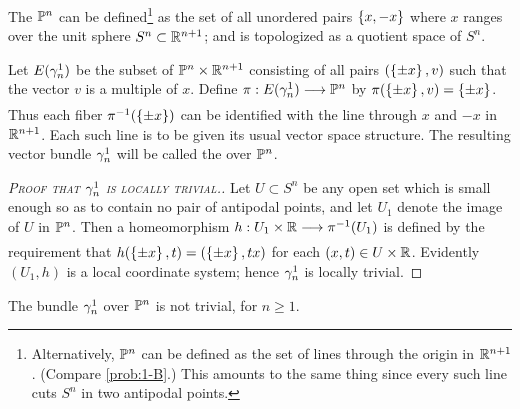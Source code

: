 \documentclass[../main]{subfiles}
\begin{document}
\begin{example}\label{ex:02.04}
The  $\mathbb{P}^{n}$ can be defined\footnote{
Alternatively, $\mathbb{P}^{n}$ can be defined as the set of lines through the origin in $\mathbb R^{n+1}$.
(Compare \ref{prob:1-B}.) This amounts to the same thing since every
such line cuts $S^{n}$ in two antipodal points.}
as the set of all unordered pairs $\left\{x, -x\right\}$ where $x$ ranges over the unit sphere
$S^{n} \subset\mathbb R^{n+1}$; and is topologized as a quotient space of $S^{n}$.

Let $E(\gamma^1_n)$ be the subset of $\mathbb{P}^{n}\times \mathbb R^{n+1}$ consisting of all pairs
$(\left\{\pm x\right\}, v)$ such that the vector $v$ is a multiple of $x$. Define $\pi: \total(\tautological^1_n)\varrightarrow{} \projective^{n}$
by $\pi(\left\{\pm x\right\} , v) = \left\{\pm x\right\}$. Thus each fiber $\pi^{-1}(\left\{\pm x\right\})$ can be identified with
the line through $x$ and $-x$ in $\mathbb R^{n+1}$. Each such line is to be given its
usual vector space structure. The resulting vector bundle $\gamma^1_n$ will be
called the  over $\mathbb{P}^{n}$.


\begin{proof}
[\textsc{Proof that $\gamma^1_n$ is locally trivial.}] Let $U \subset S^{n}$ be any open set which
is small enough so as to contain no pair of antipodal points, and let $U_1$
denote the image of $U$ in $\mathbb{P}^{n}$. Then a homeomorphism $h:U_1\times \bR\varrightarrow{}\pi\inv(U_1)$
is defined by the requirement that $h(\left\{\pm x\right\},t)=(\left\{\pm x\right\},tx)$ for each $(x, t)\in U \times \mathbb R$. Evidently $(U_1,h)$ is a local coordinate system; hence $\gamma^1_n$ is locally trivial.
\end{proof}

\end{example}


\begin{theorem}\label{thm:02.01}
The bundle $\gamma^1_n$ over $\mathbb{P}^{n}$ is not trivial, for $n \geq 1$.
\end{theorem}
\end{document}
